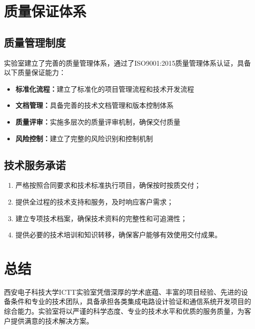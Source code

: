 \documentclass[fontset=windows]{article}
\begin{document}
\section{质量保证体系}

\subsection{质量管理制度}
实验室建立了完善的质量管理体系，通过了ISO9001:2015质量管理体系认证，具备以下质量保证能力：

\begin{itemize}
    \item \textbf{标准化流程：}建立了标准化的项目管理流程和技术开发流程
    \item \textbf{文档管理：}具备完善的技术文档管理和版本控制体系
    \item \textbf{质量评审：}实施多层次的质量评审机制，确保交付质量
    \item \textbf{风险控制：}建立了完整的风险识别和控制机制
\end{itemize}

\subsection{技术服务承诺}
\begin{enumerate}[label=(\arabic*)]
    \item 严格按照合同要求和技术标准执行项目，确保按时按质交付；
    \item 提供全过程的技术支持和服务，及时响应客户需求；
    \item 建立专项技术档案，确保技术资料的完整性和可追溯性；
    \item 提供必要的技术培训和知识转移，确保客户能够有效使用交付成果。
\end{enumerate}

\section{总结}

西安电子科技大学ICTT实验室凭借深厚的学术底蕴、丰富的项目经验、先进的设备条件和专业的技术团队，具备承担各类集成电路设计验证和通信系统开发项目的综合能力。实验室将以严谨的科学态度、专业的技术水平和优质的服务质量，为客户提供满意的技术解决方案。
\end{document}
